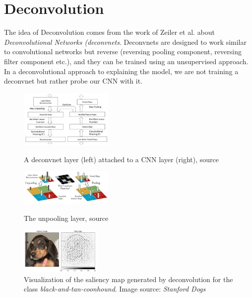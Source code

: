 \section{Deconvolution}\label{section:deconvolution}

The idea of Deconvolution \cite{zeiler2013visualizing} comes from the work of Zeiler et al. \cite{zeiler2011adaptive} about \textit{Deconvolutional Networks (\textit{deconvnets}}. Deconvnets are designed to work similar to convolutional networks but reverse (reversing pooling component, reversing filter component etc.), and they can be trained using an unsupervised approach. In a deconvolutional approach to explaining the model, we are not training a deconvnet but rather probe our CNN with it. 

\begin{figure}
\vspace{-1.5\baselineskip}
\centering
  \setlength{\belowcaptionskip}{12pt}
  \includegraphics[width=0.4\textwidth]{methods/images/deconv-layer.png}
  \caption{A deconvnet layer (left) attached to a CNN layer (right), source \cite{zeiler2013visualizing}}\label{fig:deconvolution-layer}
  \setlength{\belowcaptionskip}{12pt}
  \includegraphics[width=0.4\textwidth]{methods/images/deconv-layer-unpooling.png}
  \caption{The unpooling layer, source \cite{zeiler2013visualizing}}\label{fig:deconvolution-layer-unpooling}
  \includegraphics[width=0.35\textwidth]{methods/images/deconv-black-and-tan-coonhound.png}
  \caption{Visualization of the saliency map generated by deconvolution for the class \textit{black-and-tan-coonhound}. Image source: \textit{Stanford Dogs} \cite{stanford-dogs}}\label{fig:saliency-map-coonhound}
    \vspace{-\baselineskip}
\end{figure}

